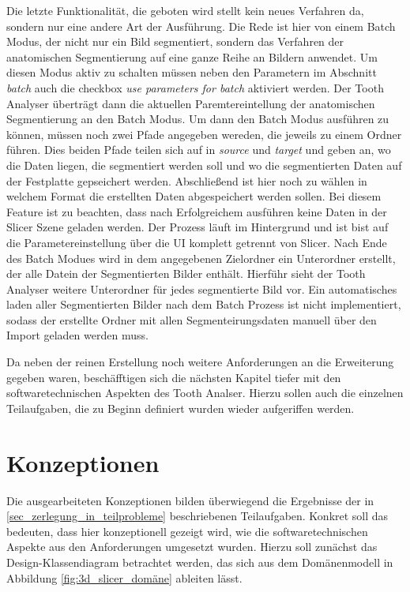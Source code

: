 Die letzte Funktionalität, die geboten wird stellt kein neues Verfahren da,
sondern nur eine andere Art der Ausführung. Die Rede ist hier von einem Batch Modus,
der nicht nur ein Bild segmentiert, sondern das Verfahren der anatomischen Segmentierung
auf eine ganze Reihe an Bildern anwendet. Um diesen Modus aktiv zu schalten
müssen neben den Parametern im Abschnitt \textit{batch} auch die checkbox \textit{use
parameters for batch} aktiviert werden. Der Tooth Analyser überträgt dann die aktuellen
Paremtereintellung der anatomischen Segmentierung an den Batch Modus. Um dann
den Batch Modus ausführen zu können, müssen noch zwei Pfade angegeben wereden,
die jeweils zu einem Ordner führen. Dies beiden Pfade teilen sich auf in \textit{source}
und \textit{target} und geben an, wo die Daten liegen, die segmentiert werden soll
und wo die segmentierten Daten auf der Festplatte gepseichert werden.
Abschließend ist hier noch zu wählen in welchem Format die erstellten Daten
abgespeichert werden sollen. Bei diesem Feature ist zu beachten, dass nach
Erfolgreichem ausführen keine Daten in der Slicer Szene geladen werden. Der Prozess
läuft im Hintergrund und ist bist auf die Parametereinstellung über die UI komplett
getrennt von Slicer. Nach Ende des Batch Modues wird in dem angegebenen
Zielordner ein Unterordner erstellt, der alle Datein der Segmentierten Bilder enthält.
Hierführ sieht der Tooth Analyser weitere Unterordner für jedes segmentierte
Bild vor. Ein automatisches laden aller Segmentierten Bilder nach dem Batch Prozess
ist nicht implementiert, sodass der erstellte Ordner mit allen
Segmenteirungsdaten manuell über den Import geladen werden muss.

Da neben der reinen Erstellung noch weitere Anforderungen an die Erweiterung
gegeben waren, beschäfftigen sich die nächsten Kapitel tiefer mit den softwaretechnischen
Aspekten des Tooth Analser. Hierzu sollen auch die einzelnen Teilaufgaben, die zu
Beginn definiert wurden wieder aufgeriffen werden.

\section{Konzeptionen}
\label{sec:konzeptionen} Die ausgearbeiteten Konzeptionen bilden überwiegend die
Ergebnisse der in \ref{sec_zerlegung_in_teilprobleme} beschriebenen Teilaufgaben.
Konkret soll das bedeuten, dass hier konzeptionell gezeigt wird, wie die
softwaretechnischen Aspekte aus den Anforderungen umgesetzt wurden. Hierzu soll zunächst
das Design-Klassendiagram betrachtet werden, das sich aus dem Domänenmodell in
Abbildung \ref{fig:3d_slicer_domäne} ableiten lässt.

